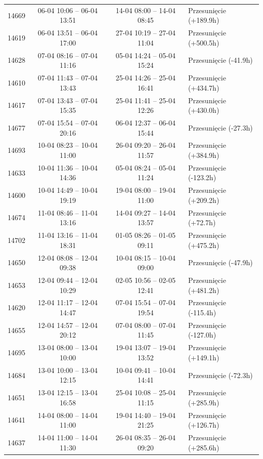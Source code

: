 \begin{table}[htbp]
\begin{tabular}{|r|c|c|l|}
14669 & 06-04 10:06 -- 06-04 13:51 & 14-04 08:00 -- 14-04 08:45 & Przesunięcie (+189.9h) \\ 
14619 & 06-04 13:51 -- 06-04 17:00 & 27-04 10:19 -- 27-04 11:04 & Przesunięcie (+500.5h) \\ 
14628 & 07-04 08:16 -- 07-04 11:16 & 05-04 14:24 -- 05-04 15:24 & Przesunięcie (-41.9h) \\ 
14610 & 07-04 11:43 -- 07-04 13:43 & 25-04 14:26 -- 25-04 16:41 & Przesunięcie (+434.7h) \\ 
14617 & 07-04 13:43 -- 07-04 15:35 & 25-04 11:41 -- 25-04 12:26 & Przesunięcie (+430.0h) \\ 
14677 & 07-04 15:54 -- 07-04 20:16 & 06-04 12:37 -- 06-04 15:44 & Przesunięcie (-27.3h) \\ 
14693 & 10-04 08:23 -- 10-04 11:00 & 26-04 09:20 -- 26-04 11:57 & Przesunięcie (+384.9h) \\ 
14633 & 10-04 11:36 -- 10-04 14:36 & 05-04 08:24 -- 05-04 11:24 & Przesunięcie (-123.2h) \\ 
14600 & 10-04 14:49 -- 10-04 19:19 & 19-04 08:00 -- 19-04 11:00 & Przesunięcie (+209.2h) \\ 
14674 & 11-04 08:46 -- 11-04 13:16 & 14-04 09:27 -- 14-04 13:57 & Przesunięcie (+72.7h) \\ 
14702 & 11-04 13:16 -- 11-04 18:31 & 01-05 08:26 -- 01-05 09:11 & Przesunięcie (+475.2h) \\ 
14650 & 12-04 08:08 -- 12-04 09:38 & 10-04 08:15 -- 10-04 09:00 & Przesunięcie (-47.9h) \\ 
14653 & 12-04 09:44 -- 12-04 10:29 & 02-05 10:56 -- 02-05 12:41 & Przesunięcie (+481.2h) \\ 
14620 & 12-04 11:17 -- 12-04 14:47 & 07-04 15:54 -- 07-04 19:54 & Przesunięcie (-115.4h) \\ 
14655 & 12-04 14:57 -- 12-04 20:12 & 07-04 08:00 -- 07-04 11:45 & Przesunięcie (-127.0h) \\ 
14695 & 13-04 08:00 -- 13-04 10:00 & 19-04 13:07 -- 19-04 13:52 & Przesunięcie (+149.1h) \\ 
14684 & 13-04 10:00 -- 13-04 12:15 & 10-04 09:41 -- 10-04 14:41 & Przesunięcie (-72.3h) \\ 
14651 & 13-04 12:15 -- 13-04 16:58 & 25-04 10:08 -- 25-04 11:15 & Przesunięcie (+285.9h) \\ 
14641 & 14-04 08:00 -- 14-04 11:00 & 19-04 14:40 -- 19-04 21:25 & Przesunięcie (+126.7h) \\ 
14637 & 14-04 11:00 -- 14-04 11:30 & 26-04 08:35 -- 26-04 09:20 & Przesunięcie (+285.6h) \\ 

\end{tabular}
\end{table}
